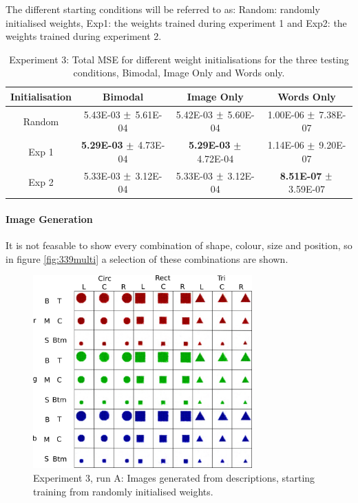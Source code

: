 The different starting conditions will be referred to as: Random: randomly initialised weights, Exp1: the weights trained during experiment 1 and Exp2: the weights trained during experiment 2.

\begin{table}[h!]
\centering
	\begin{tabular}{|c|c|c|c|}
	\hline
	Initialisation & 	Bimodal & 	Image Only 	& 	Words Only \\ \hline
	Random	&	5.43E-03	$\mypm$	5.61E-04	&	5.42E-03	$\mypm$	5.60E-04	&	1.00E-06	$\mypm$	7.38E-07	\\ \hline
Exp 1	&	\textbf{5.29E-03}	$\mypm$	4.73E-04	&	\textbf{5.29E-03}	$\mypm$	4.72E-04	&	1.14E-06	$\mypm$	9.20E-07	\\ \hline
Exp 2	&	5.33E-03	$\mypm$	3.12E-04	&	5.33E-03	$\mypm$	3.12E-04	&	\textbf{8.51E-07}	$\mypm$	3.59E-07	\\ \hline

	\end{tabular}
\caption{Experiment 3: Total MSE for different weight initialisations for the three testing conditions, Bimodal, Image Only and Words only.}
\label{tab:res339}
\end{table}


\paragraph{Image Generation}
It is not feasable to show every combination of shape, colour, size and position, so in figure \autoref{fig:339multi} a selection of these combinations are shown.

\begin{figure}[h]
\centering
\includegraphics[width=0.75\textwidth]{Figs/shapes/multiword339.png}
\caption{Experiment 3, run A: Images generated from descriptions, starting training from randomly initialised weights.}
\label{fig:339multi}
\end{figure}

